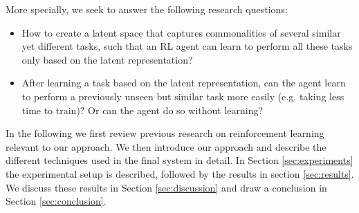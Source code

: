 More specially, we seek to answer the following research questions:
\begin{itemize}
	\item How to create a latent space that captures commonalities of several similar yet different tasks, such that an RL agent can learn to perform all these tasks only based on the latent representation?
	\item After learning a task based on the latent representation, can the agent learn to perform a previously unseen but similar task more easily (e.g. taking less time to train)? Or can the agent do so without learning?
\end{itemize}


In the following we first review previous research on reinforcement learning relevant to our approach. We then introduce our approach and describe the different techniques used in the final system in detail. In Section \ref{sec:experiments} the experimental setup is described, followed by the results in section \ref{sec:results}. We discuss these results in Section \ref{sec:discussion} and draw a conclusion in Section \ref{sec:conclusion}.